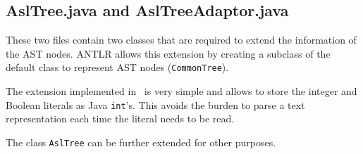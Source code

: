 \subsection{AslTree.java and AslTreeAdaptor.java}

These two files contain two classes that are required to extend the
information of the AST nodes. ANTLR allows this extension by creating
a subclass of the default class to represent AST nodes (\texttt{CommonTree}).

The extension implemented in \asl\ is very simple and allows to store the
integer and Boolean literals as Java \texttt{int}'s. This avoids the burden
to parse a text representation each time the literal needs to be read.

The class \texttt{AslTree} can be further extended for other purposes.

